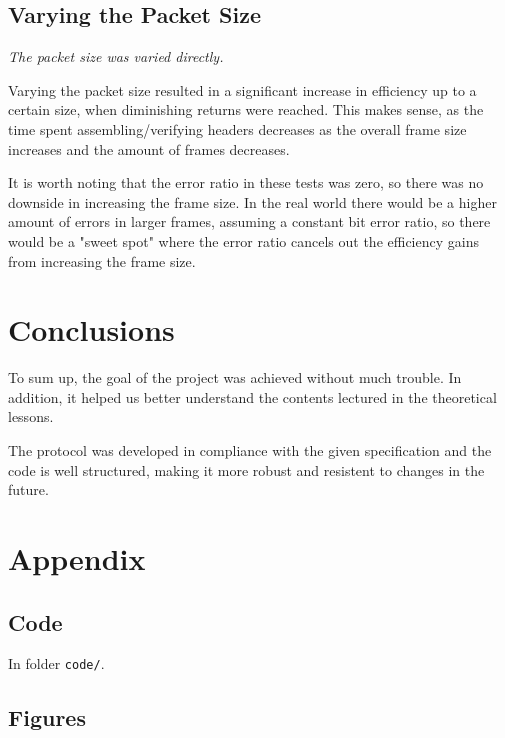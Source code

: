 \documentclass[11pt,a4paper,twocolumn]{article}
\begin{document}
\subsection{Varying the Packet Size}

\textit{The packet size was varied directly.}

Varying the packet size resulted in a significant increase in efficiency up to a certain size, when diminishing returns were reached.
This makes sense, as the time spent assembling/verifying headers decreases as the overall frame size increases and the amount of frames decreases.

It is worth noting that the error ratio in these tests was zero, so there was no downside in increasing the frame size.
In the real world there would be a higher amount of errors in larger frames, assuming a constant bit error ratio, so there would be a "sweet spot" where the error ratio cancels out the efficiency gains from increasing the frame size.

\section{Conclusions}

To sum up, the goal of the project was achieved without much trouble. In addition, it helped us better understand the contents lectured in the theoretical lessons.

The protocol was developed in compliance with the given specification and the code is well structured, making it more robust and resistent to changes in the future.

\onecolumn
\appendix
\section{Appendix}

\subsection{Code}

\noindent In folder \lstinline{code/}.

\subsection{Figures}
\label{sec:a2}

\end{document}

